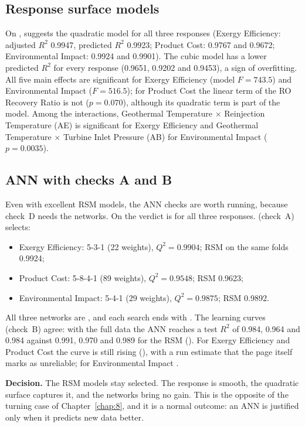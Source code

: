\subsection{Response surface models}
On ,  suggests the quadratic model for all three responses (Exergy Efficiency:
adjusted $R^2$ 0.9947, predicted $R^2$ 0.9923; Product Cost: 0.9767 and 0.9672; Environmental Impact: 0.9924 and
0.9901). The cubic model has a lower predicted $R^2$ for every response (0.9651, 0.9202 and 0.9453), a sign of
overfitting. All five main effects are significant for Exergy Efficiency (model $F=743.5$) and Environmental Impact
($F=516.5$); for Product Cost the linear term of the RO Recovery Ratio is not ($p=0.070$), although its quadratic term
is part of the model. Among the interactions, Geothermal Temperature $\times$ Reinjection Temperature (AE) is significant
for Exergy Efficiency and Geothermal Temperature $\times$ Turbine Inlet Pressure (AB) for Environmental Impact
($p=0.0035$).

\subsection{ANN with checks A and B}
Even with excellent RSM models, the ANN checks are worth running, because check~D needs the networks. On  the
 verdict is  for all three responses.  (check~A) selects:
\begin{itemize}
  \item Exergy Efficiency: 5-3-1 (22 weights), $Q^2=0.9904$; RSM on the same folds 0.9924;
  \item Product Cost: 5-8-4-1 (89 weights), $Q^2=0.9548$; RSM 0.9623;
  \item Environmental Impact: 5-4-1 (29 weights), $Q^2=0.9875$; RSM 0.9892.
\end{itemize}
All three networks are , and each search ends with . The learning curves (check~B) agree: with the full data the ANN reaches a test
$R^2$ of 0.984, 0.964 and 0.984 against 0.991, 0.970 and 0.989 for the RSM (). For Exergy Efficiency and Product Cost the curve is still rising (), with a run
estimate that the page itself marks as unreliable; for Environmental Impact .

\textbf{Decision.} The RSM models stay selected. The response is smooth, the quadratic surface captures it, and the
networks bring no gain. This is the opposite of the turning case of Chapter~\ref{chap:8}, and it is a normal outcome:
an ANN is justified only when it predicts new data better.

